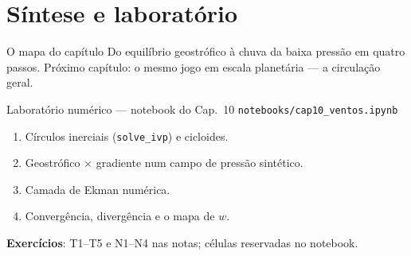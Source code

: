 \documentclass[aspectratio=169,11pt]{beamer}
\begin{document}
\section{Síntese e laboratório}

\begin{frame}{O mapa do capítulo}
  \vspace{0.6em}
  Do equilíbrio geostrófico à chuva da baixa pressão em quatro passos.
  Próximo capítulo: o mesmo jogo em escala planetária — a circulação
  geral.
\end{frame}

\begin{frame}{Laboratório numérico --- notebook do Cap.~10}
  \texttt{notebooks/cap10\_ventos.ipynb}
  \begin{enumerate}
    \item Círculos inerciais (\texttt{solve\_ivp}) e cicloides.
    \item Geostrófico × gradiente num campo de pressão sintético.
    \item Camada de Ekman numérica.
    \item Convergência, divergência e o mapa de $w$.
  \end{enumerate}
  \vspace{0.4em}
  \textbf{Exercícios}: T1--T5 e N1--N4 nas notas; células reservadas no
  notebook.
  \vfill
  \atribuicao
\end{frame}
\end{document}
